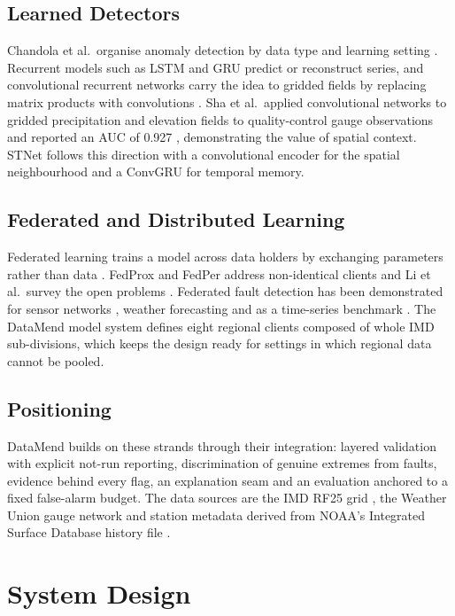 \documentclass[conference,a4paper]{IEEEtran}
\begin{document}
\subsection{Learned Detectors}
Chandola et al.\ organise anomaly detection by data type and learning setting \cite{chandola2009}. Recurrent models such as LSTM \cite{hochreiter1997} and GRU \cite{cho2014} predict or reconstruct series, and convolutional recurrent networks carry the idea to gridded fields by replacing matrix products with convolutions \cite{shi2015}. Sha et al.\ applied convolutional networks to gridded precipitation and elevation fields to quality-control gauge observations and reported an AUC of 0.927 \cite{sha2021}, demonstrating the value of spatial context. STNet follows this direction with a convolutional encoder for the spatial neighbourhood and a ConvGRU for temporal memory.

\subsection{Federated and Distributed Learning}
Federated learning trains a model across data holders by exchanging parameters rather than data \cite{mcmahan2017,kairouz2021}. FedProx \cite{li2020prox} and FedPer \cite{arivazhagan2019} address non-identical clients and Li et al.\ survey the open problems \cite{li2020sp}. Federated fault detection has been demonstrated for sensor networks \cite{khan2024}, weather forecasting \cite{chen2023} and as a time-series benchmark \cite{liu2022}. The DataMend model system defines eight regional clients composed of whole IMD sub-divisions, which keeps the design ready for settings in which regional data cannot be pooled.

\subsection{Positioning}
DataMend builds on these strands through their integration: layered validation with explicit not-run reporting, discrimination of genuine extremes from faults, evidence behind every flag, an explanation seam and an evaluation anchored to a fixed false-alarm budget. The data sources are the IMD RF25 grid \cite{pai2014}, the Weather Union gauge network \cite{weatherunion} and station metadata derived from NOAA's Integrated Surface Database history file \cite{noaaisd}.

\section{System Design}\label{sec:design}
\end{document}
